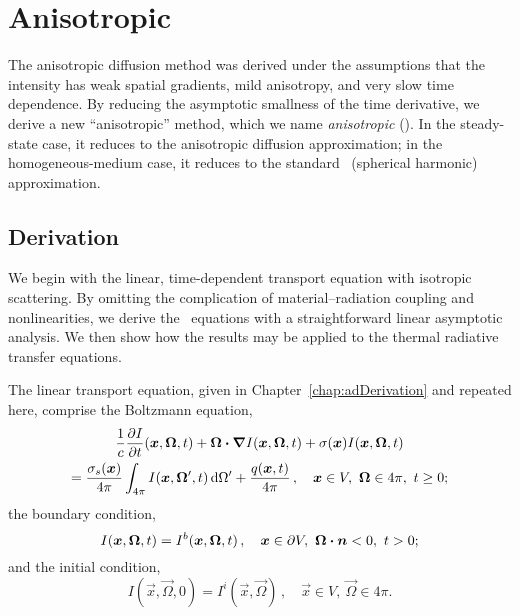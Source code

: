 

\chapter{Anisotropic \texorpdfstring{\Pone}{P1}}\label{chap:aponeDerivation}

The anisotropic diffusion method was derived under the assumptions that the
intensity has weak spatial gradients, mild anisotropy, and very slow time
dependence. By reducing the asymptotic smallness of the time derivative, we
derive a new ``anisotropic'' method, which we name \emph{anisotropic \Pone}
(\APone).
In the steady-state case, it reduces to the anisotropic diffusion approximation;
in
the homogeneous-medium case, it reduces to the standard \Pone\ (spherical
harmonic)
approximation. 

\section{Derivation}

We begin with the linear, time-dependent transport equation with isotropic
scattering. By omitting the complication of material--radiation coupling and
nonlinearities, we derive the \APone\ equations with a straightforward
linear asymptotic analysis. We then show how the results may be applied to
the thermal radiative transfer equations.

The linear transport equation, given in Chapter~\ref{chap:adDerivation}
and repeated here, comprise the Boltzmann equation,
\begin{multline} \label{eq:tdTransportVol_4}
  \frac{1}{c}\frac{\partial I}{\partial t}(\bm{x},\bm{\Omega},t)
  + \bm{\Omega}\bm{\cdot} \bm{\nabla} I(\bm{x},\bm{\Omega},t)
  + \sigma(\bm{x}) I(\bm{x},\bm{\Omega},t)
  \\ = \frac{\sigma_s(\bm{x})}{4\pi}
  \int_{4\pi} I(\bm{x},\bm{\Omega}',t) \mathop{}\!\mathrm{d} \Omega'
  + \frac{q(\bm{x},t)}{4\pi}
  \,, \quad \bm{x}\in V,\ \bm{\Omega}\in4\pi,\ t \ge 0;
\end{multline}
the boundary condition,
\begin{equation} \label{eq:tdTransportBndy_4}
  I(\bm{x},\bm{\Omega},t) = I^b(\bm{x},\bm{\Omega},t) \,,
  \quad \bm{x}\in \partial V ,\ \bm{\Omega}\bm{\cdot} \bm{n} < 0,\ t > 0;
\end{equation}
and the initial condition,
\begin{equation} \label{eq:tdTransportInit_4}
  I(\vec{x},\vec{\Omega},0) = I^i(\vec{x},\vec{\Omega}) \,,
  \quad \vec{x}\in V ,\ \vec{\Omega} \in 4\pi.
\end{equation}

